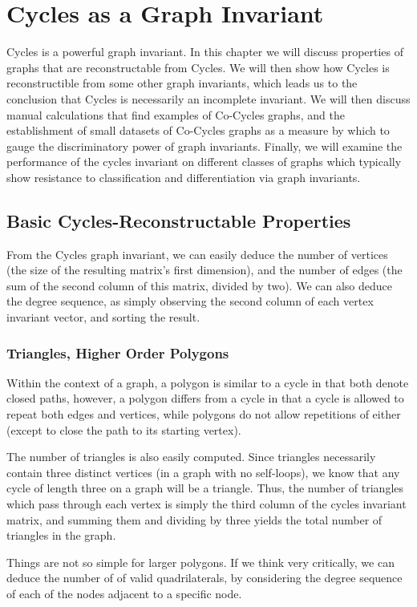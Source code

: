 \chapter{Cycles as a Graph Invariant}
Cycles is a powerful graph invariant.
In this chapter we will discuss properties of graphs that are reconstructable from Cycles.
We will then show how Cycles is reconstructible from some other graph invariants, which leads us to the conclusion that Cycles is necessarily an incomplete invariant.
We will then discuss manual calculations that find examples of Co-Cycles graphs, and the establishment of small datasets of Co-Cycles graphs as a measure by which to gauge the discriminatory power of graph invariants.
Finally, we will examine the performance of the cycles invariant on different classes of graphs which typically show resistance to classification and differentiation via graph invariants.

\section{Basic Cycles-Reconstructable Properties}

From the Cycles graph invariant, we can easily deduce the number of vertices (the size of the resulting matrix's first dimension), and the number of edges (the sum of the second column of this matrix, divided by two).
We can also deduce the degree sequence, as simply observing the second column of each vertex invariant vector, and sorting the result.

\subsection{Triangles, Higher Order Polygons}
Within the context of a graph, a polygon is similar to a cycle in that both denote closed paths, however, a polygon differs from a cycle in that a cycle is allowed to repeat both edges and vertices, while polygons do not allow repetitions of either (except to close the path to its starting vertex).

The number of triangles is also easily computed.  Since triangles necessarily contain three distinct vertices (in a graph with no self-loops), we know that any cycle of length three on a graph will be a triangle.
Thus, the number of triangles which pass through each vertex is simply the third column of the cycles invariant matrix, and summing them and dividing by three yields the total number of triangles in the graph.

Things are not so simple for larger polygons.  If we think very critically, we can deduce the number of of valid quadrilaterals, by considering the degree sequence of each of the nodes adjacent to a specific node.


